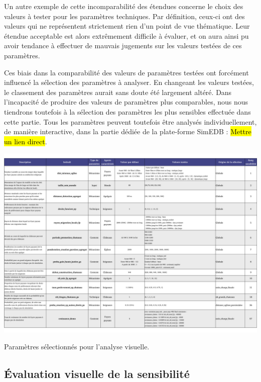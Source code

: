 Un autre exemple de cette incomparabilité des étendues concerne le choix des valeurs à tester pour les paramètres techniques.
Par définition, ceux-ci ont des valeurs qui ne représentent strictement rien d'un point de vue thématique.
Leur étendue acceptable est alors extrêmement difficile à évaluer, et on aura ainsi pu avoir tendance à effectuer de mauvais jugements sur les valeurs testées de ces paramètres.

Ces biais dans la comparabilité des valeurs de paramètres testées ont forcément influencé la sélection des paramètres à analyser.
En changeant les valeurs testées, le classement des paramètres aurait sans doute été largement altéré.
Dans l'incapacité de produire des valeurs de paramètres plus comparables, nous nous tiendrons toutefois à la sélection des paramètres \og les plus sensibles\fg{} effectuée dans cette partie.
Tous les paramètres peuvent toutefois être analysés individuellement, de manière interactive, dans la partie dédiée de la plate-forme SimEDB : \hl{Mettre un lien direct}.


\clearpage
\begin{table}[H]
\includegraphics[width=.95\textheight, angle=90, origin=c]{img/Parametres.pdf}
\caption{Paramètres sélectionnés pour l'analyse visuelle.}
\label{tab:selection-parametres-anavis}
\end{table}

\subsection{Évaluation visuelle de la sensibilité}


